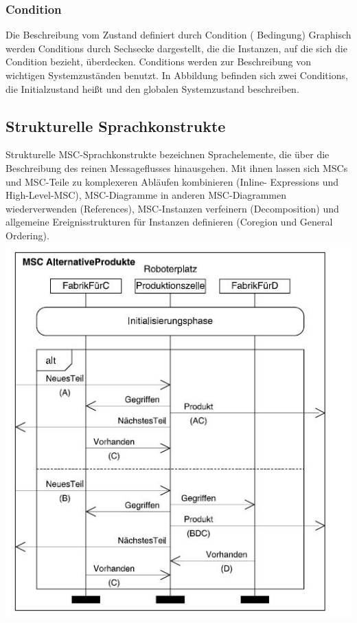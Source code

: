 \subsubsection{Condition}
Die Beschreibung vom Zustand definiert durch Condition ( Bedingung)
Graphisch werden Conditions durch Sechsecke dargestellt,
die die Instanzen, auf die sich die Condition bezieht,
überdecken. Conditions werden zur Beschreibung von
wichtigen Systemzuständen benutzt. In Abbildung befinden sich
zwei Conditions, die Initialzustand heißt und den globalen Systemzustand beschreiben.


\subsection{Strukturelle Sprachkonstrukte}
Strukturelle MSC-Sprachkonstrukte bezeichnen Sprachelemente,
die über die Beschreibung des reinen Messageflusses
hinausgehen. Mit ihnen lassen sich MSCs und
MSC-Teile zu komplexeren Abläufen kombinieren (Inline-
Expressions und High-Level-MSC), MSC-Diagramme in
anderen MSC-Diagrammen wiederverwenden (References),
MSC-Instanzen verfeinern (Decomposition) und allgemeine
Ereignisstrukturen für Instanzen definieren (Coregion und
General Ordering).\cite{MT009}\\



\includegraphics[scale=1]{Graphics/MSCmit.jpg}

